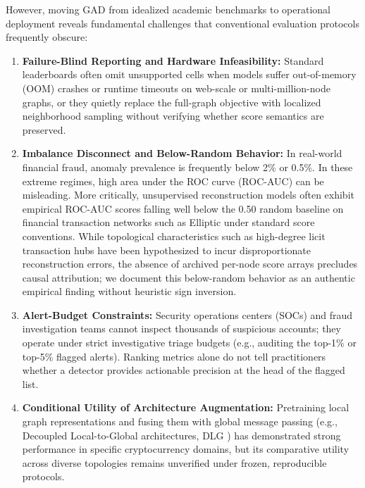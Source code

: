 \documentclass[11pt,a4paper]{article}
\begin{document}
However, moving GAD from idealized academic benchmarks to operational deployment reveals fundamental challenges that conventional evaluation protocols frequently obscure:
\begin{enumerate}
    \item \textbf{Failure-Blind Reporting and Hardware Infeasibility:} Standard leaderboards often omit unsupported cells when models suffer out-of-memory (OOM) crashes or runtime timeouts on web-scale or multi-million-node graphs, or they quietly replace the full-graph objective with localized neighborhood sampling without verifying whether score semantics are preserved.
    \item \textbf{Imbalance Disconnect and Below-Random Behavior:} In real-world financial fraud, anomaly prevalence is frequently below 2\% or 0.5\%. In these extreme regimes, high area under the ROC curve (ROC-AUC) can be misleading. More critically, unsupervised reconstruction models often exhibit empirical ROC-AUC scores falling well below the 0.50 random baseline on financial transaction networks such as Elliptic under standard score conventions. While topological characteristics such as high-degree licit transaction hubs have been hypothesized to incur disproportionate reconstruction errors, the absence of archived per-node score arrays precludes causal attribution; we document this below-random behavior as an authentic empirical finding without heuristic sign inversion.
    \item \textbf{Alert-Budget Constraints:} Security operations centers (SOCs) and fraud investigation teams cannot inspect thousands of suspicious accounts; they operate under strict investigative triage budgets (e.g., auditing the top-1\% or top-5\% flagged alerts). Ranking metrics alone do not tell practitioners whether a detector provides actionable precision at the head of the flagged list.
    \item \textbf{Conditional Utility of Architecture Augmentation:} Pretraining local graph representations and fusing them with global message passing (e.g., Decoupled Local-to-Global architectures, DLG \cite{park2026dlg}) has demonstrated strong performance in specific cryptocurrency domains, but its comparative utility across diverse topologies remains unverified under frozen, reproducible protocols.
\end{enumerate}
\end{document}
